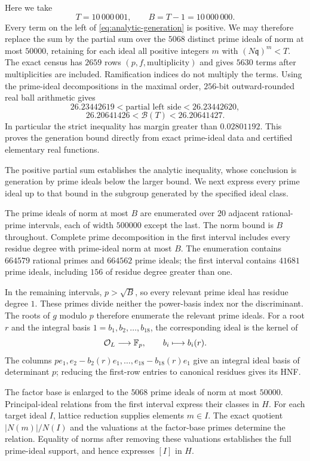 \documentclass[11pt,a4paper]{article}
\theoremstyle{definition}\newtheorem{definition}[theorem]{Definition}
\theoremstyle{remark}\newtheorem{remark}[theorem]{Remark}
\newcommand{\OO}{\mathcal O}\newcommand{\Cl}{\operatorname{Cl}}
\begin{document}
Here we take
\begin{equation}\label{eq:B}
T=10\,000\,001,\qquad B=T-1=10\,000\,000.
\end{equation}
Every term on the left of \eqref{eq:analytic-generation} is positive.
We may therefore replace the sum by the partial sum over the $5068$
distinct prime ideals of norm at most $50000$, retaining for each ideal
all positive integers $m$ with $(N\mathfrak q)^m<T$.
The exact census has $2659$ rows $(p,f,\text{multiplicity})$ and gives
$5630$ terms after multiplicities are included. Ramification indices do
not multiply the terms. Using the prime-ideal decompositions in the maximal order, $256$-bit outward-rounded real ball arithmetic gives
\[
26.23442619<\text{partial left side}<26.23442620,
\]
\[
26.20641426<\mathcal B(T)<26.20641427.
\]
In particular the strict inequality has margin greater than $0.02801192$.
This proves the generation bound directly from exact prime-ideal data and
certified elementary real functions.

The positive partial sum establishes the analytic inequality, whose conclusion is generation by prime ideals below the larger bound. We next express every prime ideal up to that bound in the subgroup generated by the specified ideal class.

The prime ideals of norm at most $B$ are enumerated over $20$ adjacent rational-prime intervals, each of width $500000$ except the last. The norm bound is $B$ throughout. Complete prime decomposition in the first interval includes every residue degree with prime-ideal norm at most $B$. The enumeration contains $664579$ rational primes and $664562$ prime ideals; the first interval contains $41681$ prime ideals, including $156$ of residue degree greater than one.

In the remaining intervals, $p>\sqrt B$, so every relevant prime ideal has residue degree $1$. These primes divide neither the power-basis index nor the discriminant. The roots of $g$ modulo $p$ therefore enumerate the relevant prime ideals. For a root $r$ and the integral basis $1=b_1,b_2,\ldots,b_{18}$, the corresponding ideal is the kernel of
\[
\OO_L\longrightarrow\F_p,\qquad b_i\longmapsto b_i(r).
\]
The columns $pe_1,e_2-b_2(r)e_1,\ldots,e_{18}-b_{18}(r)e_1$ give an integral ideal basis of determinant $p$; reducing the first-row entries to canonical residues gives its HNF.

The factor base is enlarged to the $5068$ prime ideals of norm at most $50000$. Principal-ideal relations from the first interval express their classes in $H$. For each target ideal $I$, lattice reduction supplies elements $m\in I$. The exact quotient $|N(m)|/N(I)$ and the valuations at the factor-base primes determine the relation. Equality of norms after removing these valuations establishes the full prime-ideal support, and hence expresses $[I]$ in $H$.
\end{document}
